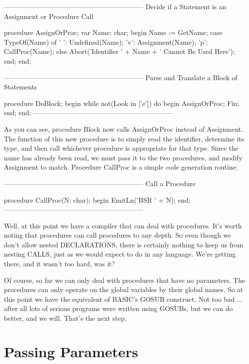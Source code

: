 \documentclass[float=false, crop=false]{standalone}
\begin{document}
{--------------------------------------------------------------}
{ Decide if a Statement is an Assignment or Procedure Call }

procedure AssignOrProc;
var Name: char;
begin
     Name := GetName;
     case TypeOf(Name) of
          ' ': Undefined(Name);
          'v': Assignment(Name);
          'p': CallProc(Name);
          else Abort('Identifier ' + Name +
                                   ' Cannot Be Used Here');
     end;
end;


{--------------------------------------------------------------}
{ Parse and Translate a Block of Statements }

procedure DoBlock;
begin
     while not(Look in ['e']) do begin
          AssignOrProc;
          Fin;
   end;
end;
{--------------------------------------------------------------}


As you can see, procedure Block now calls AssignOrProc instead of Assignment.
The function of this new procedure is to simply read the identifier, determine
its type, and then call whichever procedure is appropriate for that type. Since
the name has already been read, we must pass it to the two procedures, and
modify Assignment to match. Procedure CallProc is a simple code generation
routine:


{--------------------------------------------------------------}
{ Call a Procedure }

procedure CallProc(N: char);
begin
     EmitLn('BSR ' + N);
end;
{--------------------------------------------------------------}


Well, at this point we have a compiler that can deal with procedures. It's worth
noting that procedures can call procedures to any depth. So even though we don't
allow nested DECLARATIONS, there is certainly nothing to keep us from nesting
CALLS, just as we would expect to do in any language. We're getting there, and
it wasn't too hard, was it?

Of course, so far we can only deal with procedures that have no parameters. The
procedures can only operate on the global variables by their global names. So at
this point we have the equivalent of BASIC's GOSUB construct. Not too bad ...
after all lots of serious programs were written using GOSUBs, but we can do
better, and we will. That's the next step.


\section{Passing Parameters}
\end{document}
